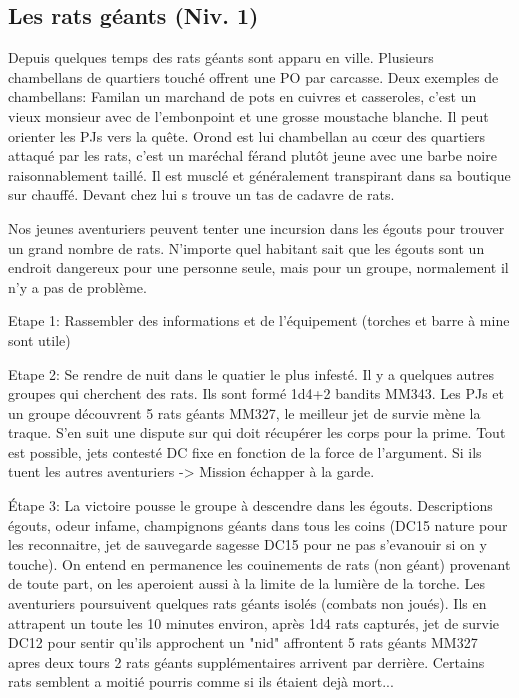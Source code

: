 \subsection{Les rats géants (Niv. 1)}
\label{ss:RatsGeants}

Depuis quelques temps des rats géants sont apparu en ville. 
Plusieurs chambellans de quartiers touché offrent une PO par carcasse.
Deux exemples de chambellans: Familan un marchand de pots en cuivres et 
casseroles, c'est un vieux monsieur avec de l'embonpoint et une grosse 
moustache blanche. Il peut orienter les PJs vers la quête.
Orond est lui chambellan au c\oe{}ur des quartiers attaqué par les rats,
c'est un maréchal férand plutôt jeune avec une barbe noire raisonnablement
taillé. Il est musclé et généralement transpirant dans sa boutique sur chauffé.
Devant chez lui s trouve un tas de cadavre de rats.

Nos jeunes aventuriers peuvent tenter une incursion dans les égouts pour trouver un grand nombre de rats.
N'importe quel habitant sait que les égouts sont un endroit dangereux pour une personne seule, mais pour 
un groupe, normalement il n'y a pas de problème.

Etape 1: Rassembler des informations et de l'équipement (torches et barre à mine sont utile)

Etape 2: Se rendre de nuit dans le quatier le plus infesté. Il y a quelques autres groupes qui cherchent
des rats. Ils sont formé 1d4+2 bandits MM343. Les PJs et un groupe découvrent 5 rats géants MM327, le 
meilleur jet de survie mène la traque. S'en suit une dispute sur qui doit récupérer les corps pour la 
prime. Tout est possible, jets contesté DC fixe en fonction de la force de l'argument. Si ils tuent les
autres aventuriers -> Mission échapper à la garde.

Étape 3: La victoire pousse le groupe à descendre dans les égouts. Descriptions égouts, odeur infame,
champignons géants dans tous les coins (DC15 nature pour les reconnaitre, jet de sauvegarde sagesse DC15 
pour ne pas s'evanouir si on y touche). On entend en permanence les couinements de rats (non géant) 
provenant de toute part, on les aperoient aussi à la limite de la lumière de la torche. Les aventuriers 
poursuivent quelques rats géants 
isolés (combats non joués). Ils en attrapent un toute les 10 minutes environ, après 1d4 rats capturés, 
jet de survie DC12 pour sentir qu'ils approchent un "nid" affrontent 5 rats géants MM327 apres deux 
tours 2 rats géants supplémentaires
arrivent par derrière. Certains rats semblent a moitié pourris comme si ils étaient dejà mort...


